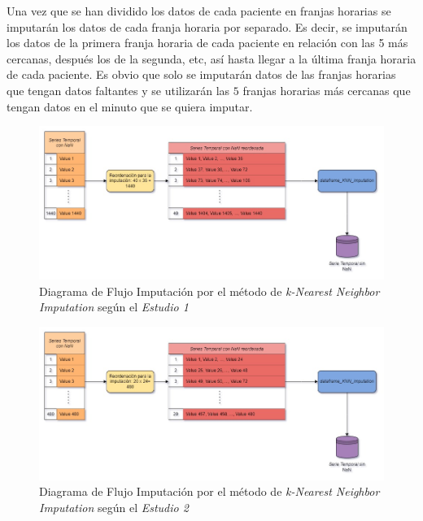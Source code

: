 Una vez que se han dividido los datos de cada paciente en franjas horarias se imputarán los datos de cada franja horaria por separado. Es decir, se imputarán los datos de la primera franja horaria de cada paciente en relación con las 5 más cercanas, después los de la segunda, etc, así hasta llegar a la última franja horaria de cada paciente. Es obvio que solo se imputarán datos de las franjas horarias que tengan datos faltantes y se utilizarán las $5$ franjas horarias más cercanas que tengan datos en el minuto que se quiera imputar.

\newpage
\thispagestyle{empty}
\begin{landscape}
    \begin{figure}[H]
        \centering
        \includegraphics[scale = 0.5]{./img/knn-diagram-e1.jpg}
        \caption{Diagrama de Flujo Imputación por el método de \textit{k-Nearest Neighbor Imputation} según el \textit{Estudio 1}}
        \label{fig:knn-diagram-e1}
    \end{figure}
    \begin{figure}[H]
        \centering
        \includegraphics[scale = 0.5]{./img/knn-diagram-e2.jpg}
        \caption{Diagrama de Flujo Imputación por el método de \textit{k-Nearest Neighbor Imputation} según el \textit{Estudio 2}}
        \label{fig:knn-diagram-e2}
    \end{figure}
\end{landscape}
\restoregeometry 

